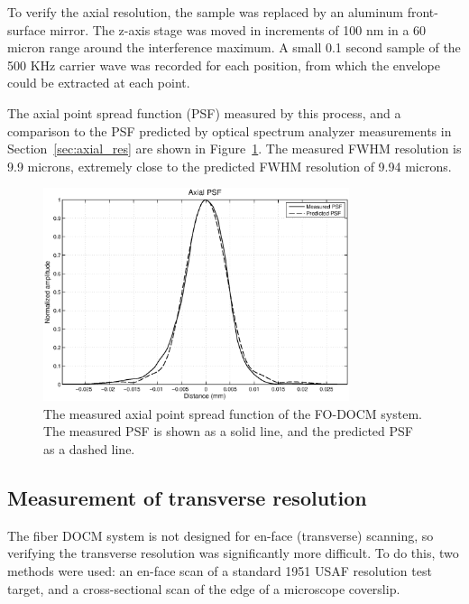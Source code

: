
To verify the axial resolution, the sample was replaced by an aluminum front-surface mirror. The z-axis stage was moved in increments of 100 nm in a 60 micron range around the interference maximum. A small 0.1 second sample of the 500 KHz carrier wave was recorded for each position, from which the envelope could be extracted at each point.

The axial point spread function (PSF) measured by this process, and a comparison to the PSF predicted by optical spectrum analyzer measurements in Section~\ref{sec:axial_res} are shown in Figure~\ref{fig:psf_comparison}. The measured FWHM resolution is 9.9 microns, extremely close to the predicted FWHM resolution of 9.94 microns.

\begin{figure}[h!]
\centering
\includegraphics[width=0.8\textwidth]{Images/Results/psf-aom2.eps}
\caption[The measured axial point spread function.]{The measured axial point spread function of the FO-DOCM system. The measured PSF is shown as a solid line, and the predicted PSF as a dashed line.\label{fig:psf_comparison}}
\end{figure}

\subsection{Measurement of transverse resolution}

The fiber DOCM system is not designed for en-face (transverse) scanning, so verifying the transverse resolution was significantly more difficult. To do this, two methods were used: an en-face scan of a standard 1951 USAF resolution test target, and a cross-sectional scan of the edge of a microscope coverslip.

